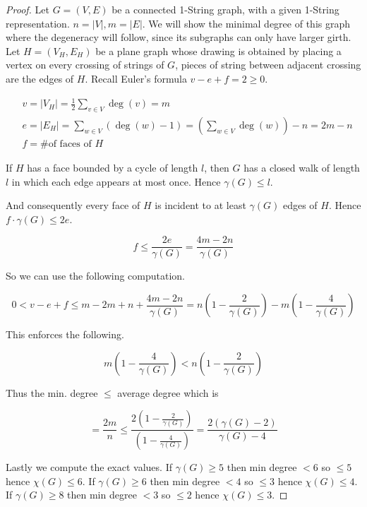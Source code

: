 \begin{proof}
	Let $G = (V,E)$ be a connected 1-String graph, with a given 1-String representation. $n = |V|, m = |E|$. We will show the minimal degree of this graph where the degeneracy will follow, since its subgraphs can only have larger girth. Let $H = (V_H, E_H)$ be a plane graph whose drawing is obtained by placing a vertex on every crossing of strings of $G$, pieces of string between adjacent crossing are the edges of $H$. Recall Euler's formula $v - e + f = 2 \geq 0$.
	
	$$
	\begin{aligned}
		&v = |V_H| = \frac{1}{2} \sum_{v \in V} \deg(v) = m \\
		&e = |E_H| = \sum_{w \in V}(\deg(w) - 1) = \left(\sum_{w \in V} \deg (w)\right) - n = 2m - n \\
		&f = \text{\# of faces of } H
	\end{aligned}
	$$
	
	\begin{observ}
		If $H$ has a face bounded by a cycle of length $l$, then $G$ has a closed walk of length $l$ in which each edge appears at most once. Hence $\gamma(G) \leq l$.
	\end{observ}
	
	And consequently every face of $H$ is incident to at least $\gamma(G)$ edges of $H$. Hence $f \cdot \gamma(G) \leq 2 e$.
	
	$$
	f \leq \frac{2e}{\gamma(G)} = \frac{4m - 2n}{\gamma(G)}
	$$
	
	So we can use the following computation.
	
	$$
	0 < v - e + f \leq m - 2m + n + \frac{4m - 2n}{\gamma(G)} = n \left(1 - \frac{2}{\gamma(G)} \right) - m \left(1 - \frac{4}{\gamma(G)} \right)
	$$
	
	\noindent This enforces the following.
	
	$$
	m \left(1 - \frac{4}{\gamma(G)}\right) < n \left(1 - \frac{2}{\gamma(G)} \right)
	$$
	
	\noindent Thus the min. degree $\leq$ average degree which is
	
	$$
	= \frac{2m}{n} \leq \frac{2 \left(1 - \frac{2}{\gamma(G)} \right)}{\left(1 - \frac{4}{\gamma(G)}\right)} = \frac{2 (\gamma(G) -2)}{\gamma(G) - 4}
	$$
	
	\noindent Lastly we compute the exact values. If $\gamma(G) \geq 5$ then min degree $< 6$ so $\leq 5$ hence $\chi(G) \leq 6$. If $\gamma(G) \geq 6$ then min degree $< 4$ so $\leq 3$ hence $\chi(G) \leq 4$. If $\gamma(G) \geq 8$ then min degree $< 3$ so $\leq 2$ hence $\chi(G) \leq 3$.
\end{proof}

